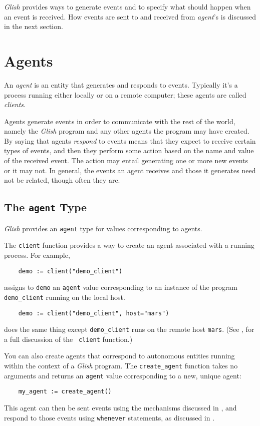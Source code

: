 {\em Glish} provides ways to generate events and to specify what 
should happen
when an event is received.  How events are sent to 
and received from {\em agent}'s is discussed in the next section.

\section{Agents}
\label{agents}

An {\em agent} is an entity that generates and responds to events.
Typically it's a process running either locally or on a remote computer;
these agents are called {\em clients\/}.

Agents generate events in order to communicate with the rest of
the world, namely the {\em Glish} program and any other agents the program
may have created.  By saying that agents {\em respond} to events
means that they expect to receive certain types of events,
and then they perform some action based on the name and value of
the received event.  The action may entail generating one or more new events
or it may not.  In general, the events an agent receives and those it
generates need not be related, though often they are.

\subsection{The {\tt agent} Type}
\label{agent-type}

{\em Glish} provides an {\tt agent} type for values 
corresponding to agents.

\begin{sloppy}
The {\tt client} function provides a way to create an agent associated
with a running process.  For example,
\begin{verbatim}
    demo := client("demo_client")
\end{verbatim}
assigns to {\tt demo} an {\tt agent} value corresponding to an
instance of the program {\tt demo\_client} running on the local host.
\begin{verbatim}
    demo := client("demo_client", host="mars")
\end{verbatim}
does the same thing except {\tt demo\_client} runs on the remote host
{\tt mars}.  (See , for a full discussion of the {\tt
client} function.)
\end{sloppy}

You can also create agents that correspond to autonomous entities running
within the context of a {\em Glish} program.  The {\tt create\_agent}
function takes no arguments and returns an {\tt agent} 
value corresponding to
a new, unique agent:
\begin{verbatim}
    my_agent := create_agent()
\end{verbatim}
This agent can then be sent events using the mechanisms discussed in
, and respond to those events using {\tt whenever}
statements, as discussed in .


